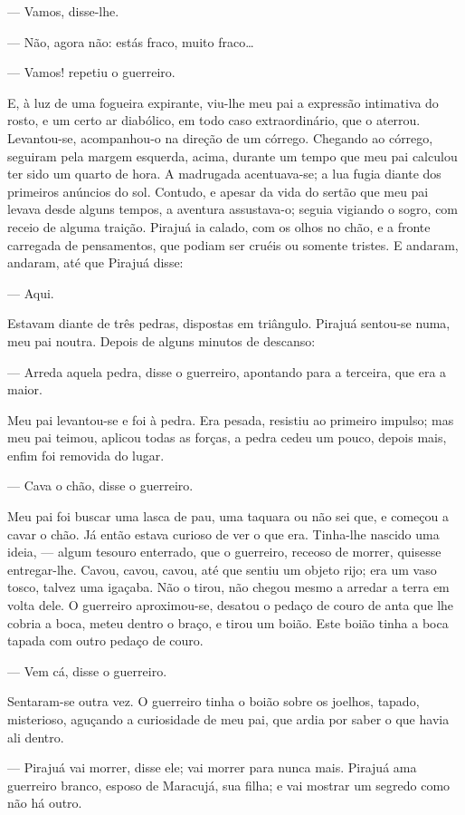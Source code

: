 --- Vamos, disse-lhe.

--- Não, agora não: estás fraco, muito fraco\ldots{}

--- Vamos! repetiu o guerreiro.

E, à luz de uma fogueira expirante, viu-lhe meu pai a expressão
intimativa do rosto, e um certo ar diabólico, em todo caso
extraordinário, que o aterrou. Levantou-se, acompanhou-o na direção de
um córrego. Chegando ao córrego, seguiram pela margem esquerda, acima,
durante um tempo que meu pai calculou ter sido um quarto de hora. A
madrugada acentuava-se; a lua fugia diante dos primeiros anúncios do
sol. Contudo, e apesar da vida do sertão que meu pai levava desde alguns
tempos, a aventura assustava-o; seguia vigiando o sogro, com receio de
alguma traição. Pirajuá ia calado, com os olhos no chão, e a fronte
carregada de pensamentos, que podiam ser cruéis ou somente tristes. E
andaram, andaram, até que Pirajuá disse:

--- Aqui.

Estavam diante de três pedras, dispostas em triângulo. Pirajuá
sentou-se numa, meu pai noutra. Depois de alguns minutos de descanso:

--- Arreda aquela pedra, disse o guerreiro, apontando para a terceira,
que era a maior.

Meu pai levantou-se e foi à pedra. Era pesada, resistiu ao primeiro
impulso; mas meu pai teimou, aplicou todas as forças, a pedra cedeu um
pouco, depois mais, enfim foi removida do lugar.

--- Cava o chão, disse o guerreiro.

Meu pai foi buscar uma lasca de pau, uma taquara ou não sei que, e
começou a cavar o chão. Já então estava curioso de ver o que era.
Tinha-lhe nascido uma ideia, --- algum tesouro enterrado, que o
guerreiro, receoso de morrer, quisesse entregar-lhe. Cavou, cavou,
cavou, até que sentiu um objeto rijo; era um vaso tosco, talvez uma
igaçaba. Não o tirou, não chegou mesmo a arredar a terra em volta dele.
O guerreiro aproximou-se, desatou o pedaço de couro de anta que lhe
cobria a boca, meteu dentro o braço, e tirou um boião. Este boião tinha
a boca tapada com outro pedaço de couro.

--- Vem cá, disse o guerreiro.

Sentaram-se outra vez. O guerreiro tinha o boião sobre os joelhos,
tapado, misterioso, aguçando a curiosidade de meu pai, que ardia por
saber o que havia ali dentro.

--- Pirajuá vai morrer, disse ele; vai morrer para nunca mais. Pirajuá
ama guerreiro branco, esposo de Maracujá, sua filha; e vai mostrar um
segredo como não há outro.


